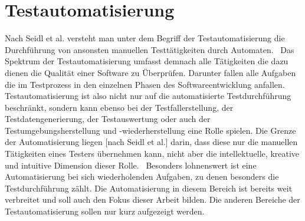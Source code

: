 \chapter{Testautomatisierung}
\label{sec:testautomatisierung}

Nach Seidl et al. versteht man unter dem Begriff der Testautomatisierung \glqq die Durchführung von ansonsten manuellen Testtätigkeiten durch Automaten.\grqq\ \cite[Seite 7]{seidl_basiswissen_2012}
Das Spektrum der Testautomatisierung umfasst demnach alle Tätigkeiten die dazu dienen die Qualität einer Software zu Überprüfen. Darunter fallen alle Aufgaben die im Testprozess in den einzelnen Phasen des Softwareentwicklung anfallen.
Testautomatisierung ist also nicht nur auf die automatisierte Testdurchführung beschränkt, sondern kann ebenso bei der Testfallerstellung, der Testdatengenerierung, der Testauswertung oder auch der Testumgebungsherstellung und -wiederherstellung eine Rolle spielen.
\glqq Die Grenze der Automatisierung liegen [nach Seidl et al.] darin, dass diese nur die manuellen Tätigkeiten eines Testers übernehmen kann, nicht aber die intellektuelle, kreative und intuitive Dimension dieser Rolle.\grqq\ \cite[Seite 7]{seidl_basiswissen_2012}
Besonders lohnenswert ist eine Automatisierung bei sich wiederholenden Aufgaben, zu denen
besonders die Testdurchführung zählt. Die Automatisierung in diesem Bereich ist bereits weit verbreitet und soll auch den Fokus dieser Arbeit bilden. Die anderen Bereiche der Testautomatisierung sollen nur kurz aufgezeigt werden.
